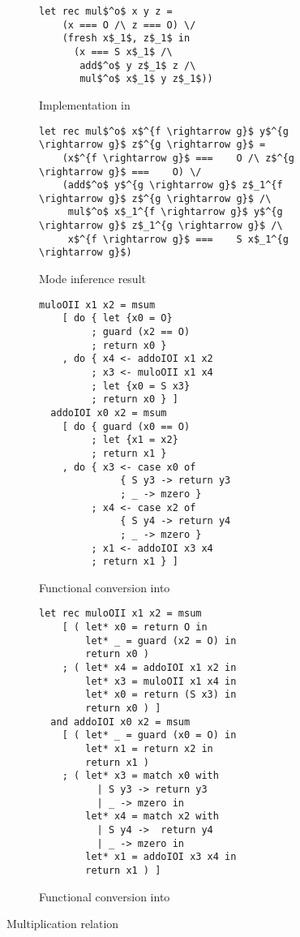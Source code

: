 \begin{figure*}[t!]
  \centering
  \vspace{1.5mm}
  \begin{subfigure}[b]{0.45\textwidth}
    \begin{lstlisting}[frame=tb]
  let rec mul$^o$ x y z =
    (x === O /\ z === O) \/
    (fresh x$_1$, z$_1$ in
      (x === S x$_1$ /\
       add$^o$ y z$_1$ z /\
       mul$^o$ x$_1$ y z$_1$))
    \end{lstlisting}
    \caption{Implementation in \mk}
    \label{fig:mult_mk}
  \end{subfigure}
  \hfill
  \begin{subfigure}[b]{0.45\textwidth}
    \begin{lstlisting}[frame=tb]
  let rec mul$^o$ x$^{f \rightarrow g}$ y$^{g \rightarrow g}$ z$^{g \rightarrow g}$ =
    (x$^{f \rightarrow g}$ ===    O /\ z$^{g \rightarrow g}$ ===    O) \/
    (add$^o$ y$^{g \rightarrow g}$ z$_1^{f \rightarrow g}$ z$^{g \rightarrow g}$ /\
     mul$^o$ x$_1^{f \rightarrow g}$ y$^{g \rightarrow g}$ z$_1^{g \rightarrow g}$ /\
     x$^{f \rightarrow g}$ ===    S x$_1^{g \rightarrow g}$)
    \end{lstlisting}
    \caption{Mode inference result}
    \label{fig:mult_modded}
  \end{subfigure}

  \hfill

  \begin{subfigure}[b]{0.45\textwidth}
    \begin{lstlisting}[frame=tb]
  muloOII x1 x2 = msum
    [ do { let {x0 = O}
         ; guard (x2 == O)
         ; return x0 }
    , do { x4 <- addoIOI x1 x2
         ; x3 <- muloOII x1 x4
         ; let {x0 = S x3}
         ; return x0 } ]
  addoIOI x0 x2 = msum
    [ do { guard (x0 == O)
         ; let {x1 = x2}
         ; return x1 }
    , do { x3 <- case x0 of
              { S y3 -> return y3
              ; _ -> mzero }
         ; x4 <- case x2 of
              { S y4 -> return y4
              ; _ -> mzero }
         ; x1 <- addoIOI x3 x4
         ; return x1 } ]
    \end{lstlisting}
    \caption{Functional conversion into \haskell}
    \label{fig:mult_haskell}
  \end{subfigure}
  \hfill
  \begin{subfigure}[b]{0.45\textwidth}
    \begin{lstlisting}[frame=tb]
  let rec muloOII x1 x2 = msum
    [ ( let* x0 = return O in
        let* _ = guard (x2 = O) in
        return x0 )
    ; ( let* x4 = addoIOI x1 x2 in
        let* x3 = muloOII x1 x4 in
        let* x0 = return (S x3) in
        return x0 ) ]
  and addoIOI x0 x2 = msum
    [ ( let* _ = guard (x0 = O) in
        let* x1 = return x2 in
        return x1 )
    ; ( let* x3 = match x0 with
          | S y3 -> return y3
          | _ -> mzero in
        let* x4 = match x2 with
          | S y4 ->  return y4
          | _ -> mzero in
        let* x1 = addoIOI x3 x4 in
        return x1 ) ]
    \end{lstlisting}
    \caption{Functional conversion into \ocaml}
    \label{fig:mult_ocaml}
  \end{subfigure}

  \caption{Multiplication relation}
  \label{fig:mult}
\end{figure*}
